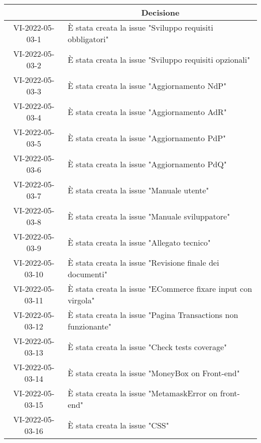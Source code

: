 \begin{table}[H]
	\centering
	\renewcommand{\arraystretch}{1.8}
	\begin{tabular}{c | p{10cm}}
		\rowcolor[HTML]{125E28}
		\multicolumn{1}{c}{\color[HTML]{FFFFFF} \textbf{ID}} &
		\multicolumn{1}{c}{\color[HTML]{FFFFFF} \textbf{Decisione}} \\
		\hline
		VI-2022-05-03-1 & È stata creata la issue "Sviluppo requisiti obbligatori" \\ \hline
		VI-2022-05-03-2 & È stata creata la issue "Sviluppo requisiti opzionali" \\ \hline
		VI-2022-05-03-3 & È stata creata la issue "Aggiornamento NdP" \\ \hline
		VI-2022-05-03-4 & È stata creata la issue "Aggiornamento AdR" \\ \hline
		VI-2022-05-03-5 & È stata creata la issue "Aggiornamento PdP" \\ \hline
		VI-2022-05-03-6 & È stata creata la issue "Aggiornamento PdQ" \\ \hline
		VI-2022-05-03-7 & È stata creata la issue "Manuale utente" \\ \hline
		VI-2022-05-03-8 & È stata creata la issue "Manuale sviluppatore" \\ \hline
		VI-2022-05-03-9 & È stata creata la issue "Allegato tecnico" \\ \hline
		VI-2022-05-03-10 & È stata creata la issue "Revisione finale dei documenti" \\ \hline
		VI-2022-05-03-11 & È stata creata la issue "ECommerce fixare input con virgola" \\ \hline
		VI-2022-05-03-12 & È stata creata la issue "Pagina Transactions non funzionante" \\ \hline
		VI-2022-05-03-13 & È stata creata la issue "Check tests coverage" \\ \hline
		VI-2022-05-03-14 & È stata creata la issue "MoneyBox on Front-end" \\ \hline
		VI-2022-05-03-15 & È stata creata la issue "MetamaskError on front-end" \\ \hline
		VI-2022-05-03-16 & È stata creata la issue "CSS" \\ \hline
	\end{tabular}
\end{table}